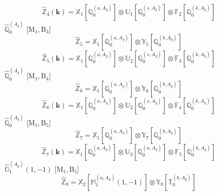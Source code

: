 \documentclass[fleqn,10pt,landscape]{article}
\begin{document}
\begin{itemize}
\begin{dmath*}
\hat{\mathbb{Z}}_{4}(\bm{k})=\mathbb{X}_{1}[\mathbb{Q}_{0}^{(a,A_{g})}] \otimes\mathbb{U}_{1}[\mathbb{Q}_{0}^{(s,A_{g})}] \otimes\mathbb{F}_{2}[\mathbb{Q}_{0}^{(k,A_{g})}]
\end{dmath*}
\vspace{4mm}
\noindent {} $\,\,\,\hat{\mathbb{Q}}_{0}^{(A_{g})}$ [M$_{1}$,\,B$_{3}$]
\begin{dmath*}
\hat{\mathbb{Z}}_{5}=\mathbb{X}_{1}[\mathbb{Q}_{0}^{(a,A_{g})}] \otimes\mathbb{Y}_{5}[\mathbb{Q}_{0}^{(b,A_{g})}]
\end{dmath*}
\begin{dmath*}
\hat{\mathbb{Z}}_{5}(\bm{k})=\mathbb{X}_{1}[\mathbb{Q}_{0}^{(a,A_{g})}] \otimes\mathbb{U}_{2}[\mathbb{Q}_{0}^{(s,A_{g})}] \otimes\mathbb{F}_{3}[\mathbb{Q}_{0}^{(k,A_{g})}]
\end{dmath*}
\vspace{4mm}
\noindent {} $\,\,\,\hat{\mathbb{Q}}_{0}^{(A_{g})}$ [M$_{1}$,\,B$_{4}$]
\begin{dmath*}
\hat{\mathbb{Z}}_{6}=\mathbb{X}_{1}[\mathbb{Q}_{0}^{(a,A_{g})}] \otimes\mathbb{Y}_{6}[\mathbb{Q}_{0}^{(b,A_{g})}]
\end{dmath*}
\begin{dmath*}
\hat{\mathbb{Z}}_{6}(\bm{k})=\mathbb{X}_{1}[\mathbb{Q}_{0}^{(a,A_{g})}] \otimes\mathbb{U}_{2}[\mathbb{Q}_{0}^{(s,A_{g})}] \otimes\mathbb{F}_{4}[\mathbb{Q}_{0}^{(k,A_{g})}]
\end{dmath*}
\vspace{4mm}
\noindent {} $\,\,\,\hat{\mathbb{Q}}_{0}^{(A_{g})}$ [M$_{1}$,\,B$_{5}$]
\begin{dmath*}
\hat{\mathbb{Z}}_{7}=\mathbb{X}_{1}[\mathbb{Q}_{0}^{(a,A_{g})}] \otimes\mathbb{Y}_{7}[\mathbb{Q}_{0}^{(b,A_{g})}]
\end{dmath*}
\begin{dmath*}
\hat{\mathbb{Z}}_{7}(\bm{k})=\mathbb{X}_{1}[\mathbb{Q}_{0}^{(a,A_{g})}] \otimes\mathbb{U}_{3}[\mathbb{Q}_{0}^{(u,A_{g})}] \otimes\mathbb{F}_{5}[\mathbb{Q}_{0}^{(k,A_{g})}]
\end{dmath*}
\vspace{4mm}
\noindent {} $\,\,\,\hat{\mathbb{G}}_{1}^{(A_{g})}(1,-1)$ [M$_{1}$,\,B$_{5}$]
\begin{dmath*}
\hat{\mathbb{Z}}_{8}=\mathbb{X}_{2}[\mathbb{M}_{1}^{(a,A_{g})}(1,-1)] \otimes\mathbb{Y}_{8}[\mathbb{T}_{0}^{(b,A_{g})}]
\end{dmath*}
\begin{dmath*}

\end{dmath*}
\end{itemize}
\end{document}

